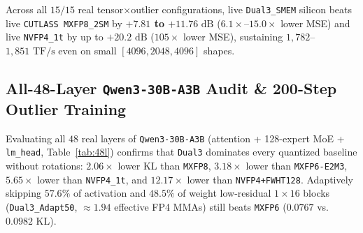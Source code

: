 \documentclass[conference,10pt]{IEEEtran}
\begin{document}
\begin{table}[t]
\centering
\caption{Live Hardware \texttt{CUTLASS SM100 2SM} SQNR (dB) on Real \texttt{Qwen3-30B-A3B} Weights ($M{=}4096$, Zero Simulation).}
\label{tab:live_hw}
\end{table}

Across all $15/15$ real tensor$\times$outlier configurations, live \texttt{Dual3\_SMEM} silicon beats live \texttt{CUTLASS MXFP8\_2SM} by \textbf{$+7.81$ to $+11.76\text{ dB}$} ($6.1\times$--$15.0\times$ lower MSE) and live \texttt{NVFP4\_1t} by up to \textbf{$+20.2\text{ dB}$} ($105\times$ lower MSE), sustaining $1{,}782$--$1{,}851\text{ TF/s}$ even on small $[4096,2048,4096]$ shapes.

\subsection{All-48-Layer \texttt{Qwen3-30B-A3B} Audit \& 200-Step Outlier Training}
Evaluating all $48$ real layers of \texttt{Qwen3-30B-A3B} (attention + 128-expert MoE + \texttt{lm\_head}, Table~\ref{tab:48l}) confirms that \texttt{Dual3} dominates every quantized baseline without rotations: $2.06\times$ lower KL than \texttt{MXFP8}, $3.18\times$ lower than \texttt{MXFP6-E2M3}, $5.65\times$ lower than \texttt{NVFP4\_1t}, and $12.17\times$ lower than \texttt{NVFP4+FWHT128}. Adaptively skipping $57.6\%$ of activation and $48.5\%$ of weight low-residual $1{\times}16$ blocks (\texttt{Dual3\_Adapt50}, $\approx 1.94$ effective FP4 MMAs) still beats \texttt{MXFP6} ($0.0767$ vs.\ $0.0982$ KL).
\end{document}
